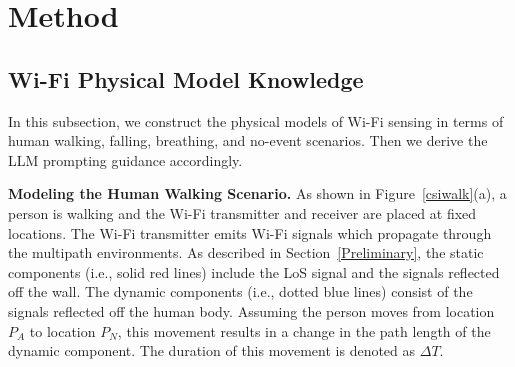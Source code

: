 \section{Method}
\subsection{Wi-Fi Physical Model Knowledge}
\label{phisical}
In this subsection, we construct the physical models of Wi-Fi sensing in terms of human walking, falling, breathing, and no-event scenarios. Then we derive the LLM prompting guidance accordingly.



\textbf{Modeling the Human Walking Scenario.} As shown in Figure~\ref{csiwalk}(a), a person is walking and the Wi-Fi transmitter and receiver are placed at fixed locations. The Wi-Fi transmitter emits Wi-Fi signals which propagate through the multipath environments. As described in Section~\ref{Preliminary}, the static components (i.e., solid red lines) include the LoS signal and the signals reflected off the wall. The dynamic components (i.e., dotted blue lines) consist of the signals reflected off the human body. Assuming the person moves from location $P_A$ to location $P_N$, this movement results in a change in the path length of the dynamic component. The duration of this movement is denoted as $\Delta T$. 

